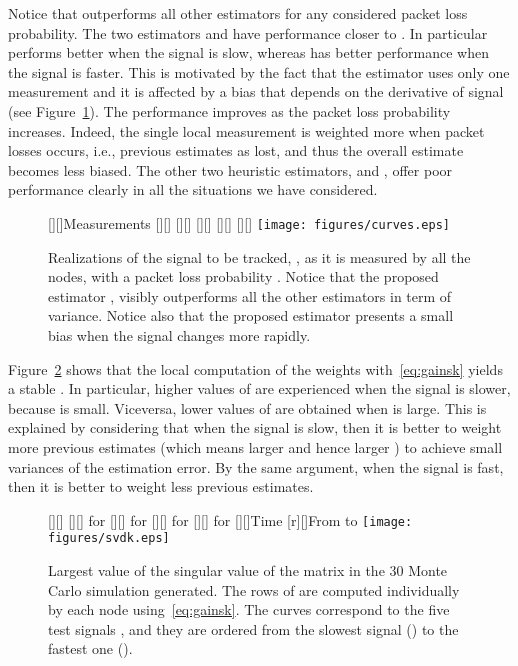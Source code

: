 \documentclass[a4paper,notitlepage,onecolumn]{article}
\numberwithin{equation}{section}
\begin{document}
Notice that  outperforms all other estimators for any
considered packet loss probability. The two estimators  and
 have performance closer to . In particular 
performs better when the signal is slow, whereas  has better
performance when the signal is faster. This is motivated by the
fact that the estimator  uses only one measurement and it is
affected by a bias that depends on the derivative of signal 
(see Figure~\ref{fig:curves}). The  performance improves as
the packet loss probability increases. Indeed, the single local
measurement is weighted more when packet losses occurs, i.e.,
previous estimates as lost, and thus the overall estimate becomes
less biased. The other two heuristic estimators,  and ,
offer poor performance clearly in all the situations we have
considered.
\begin{figure}
    \centering
    [][]{Measurements}
    [][]{}
    [][]{}
    [][]{}
    [][]{}
    [][]{}
    \texttt{[image: figures/curves.eps]}
    \caption{Realizations of the signal to be tracked, , as it is measured by all the  nodes, with a packet loss probability . Notice that the proposed estimator , visibly outperforms all the other estimators in term of variance. Notice also that the proposed estimator presents a small bias when the signal changes more rapidly.}
    \label{fig:curves}
\end{figure}
Figure~\ref{fig:svdk} shows that the local computation of the weights  with~\eqref{eq:gainsk} yields a stable . In particular, higher values of  are experienced when the signal is slower, because  is small. Viceversa, lower values of  are obtained when  is large. This is explained by considering that when the signal is slow, then it is better to weight more previous estimates (which means larger  and hence larger ) to achieve small variances of the estimation error. By the same argument, when the signal is fast, then it is better to weight less previous estimates.
\begin{figure}
    \centering
    [][]{}
    [][]{ for }
    [][]{ for }
    [][]{ for }
    [][]{ for }
    [][]{Time}
    [r][]{\small{From  to }}
    \texttt{[image: figures/svdk.eps]}
    \caption{Largest value of the singular value of the matrix  in the 30 Monte Carlo simulation generated. The rows of  are computed individually by each node using~\eqref{eq:gainsk}. The curves correspond to the five test signals , and they are ordered from the slowest signal () to the fastest one ().}
    \label{fig:svdk}
\end{figure}
\end{document}
